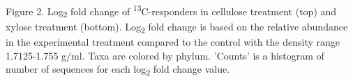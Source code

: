 Figure 2.  Log\textsubscript{2} fold change of \textsuperscript{13}C-responders in cellulose treatment (top) and xylose treatment (bottom).  Log\textsubscript{2} fold change is based on the relative abundance in the experimental treatment compared to the control with the density range 1.7125-1.755 g/ml. Taxa are colored by phylum. 'Counts' is a histogram of number of sequences for each log\textsubscript{2} fold change value.    